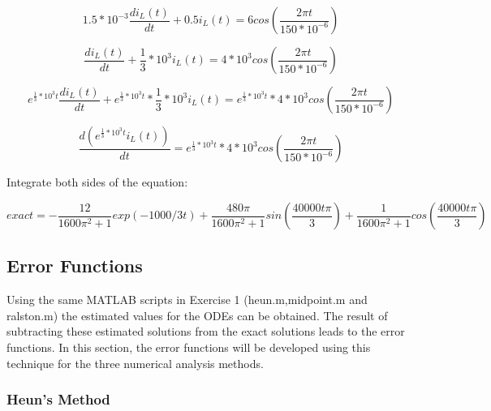 \documentclass[11pt,a4paper]{article}
\begin{document}
\begin{equation}
1.5*10^{-3}\frac{di_L(t)}{dt}+0.5i_L(t)=6cos(\frac{2{\pi}t}{150*{10^{-6}}})
\end{equation}

\begin{equation}
\frac{di_L(t)}{dt}+\frac{1}{3}*10^3i_L(t)=4*10^3cos(\frac{2{\pi}t}{150*{10^{-6}}})
\end{equation}

\begin{equation}
e^{{\frac{1}{3}*10^3}t}\frac{di_L(t)}{dt}+e^{{\frac{1}{3}*10^3}t}*\frac{1}{3}*10^3i_L(t)=e^{{\frac{1}{3}*10^3}t}*4*10^3cos(\frac{2{\pi}t}{150*{10^{-6}}})
\end{equation}

\begin{equation}
\frac{d(e^{{\frac{1}{3}*10^3}t}i_L(t))}{dt}=e^{{\frac{1}{3}*10^3}t}*4*10^3cos(\frac{2{\pi}t}{150*{10^{-6}}})
\end{equation}

Integrate both sides of the equation:

\begin{equation}
exact=-\frac{12}{1600\pi^2+1}exp(-1000/3t)+\frac{480\pi}{1600\pi^2+1}sin(\frac{40000t\pi}{3})+\frac{1}{1600\pi^2+1}cos(\frac{40000t\pi}{3})
\end{equation}

\subsection{Error Functions}
Using the same MATLAB scripts in Exercise 1 (heun.m,midpoint.m and ralston.m) the estimated values for the ODEs can be obtained. The result of subtracting these estimated solutions from the exact solutions leads to the error functions. In this section, the error functions will be developed using this technique for the three numerical analysis methods.
\pagebreak

\subsubsection{Heun's Method}
\end{document}
